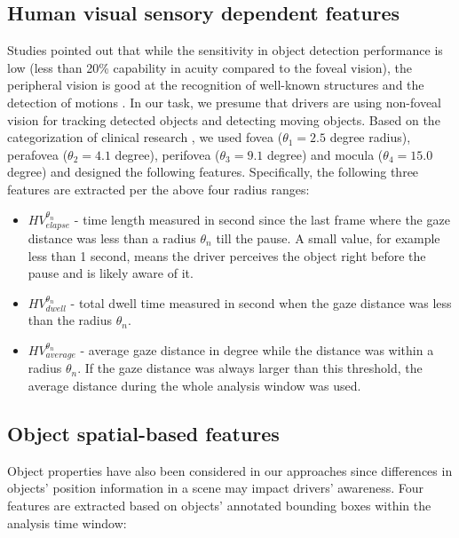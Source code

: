 \documentclass[letterpaper, 10 pt, conference]{ieeeconf}  %
\begin{document}
\subsection{Human visual sensory dependent features}\label{sec:fovea-feature}

Studies pointed out that while the sensitivity in object detection performance is low (less than 20\% capability in acuity compared to the foveal vision), the peripheral vision is good at the recognition of well-known structures and the detection of motions \cite{nelson1974motion}. In our task, we presume that drivers are using non-foveal vision for tracking detected objects and detecting moving objects. Based on the categorization of clinical research \cite{quinn2019clinical}, we used fovea ($\theta_1 = 2.5$ degree radius), perafovea ($\theta_2 = 4.1$ degree), perifovea ($\theta_3 = 9.1$ degree) and mocula ($\theta_4 = 15.0$ degree) and designed the following features. Specifically, the following three features are extracted per the above four radius ranges:

\begin{itemize}
    \item $HV^{\theta_n}_{elapse}$ - time length measured in second since the last frame where the gaze distance was less than a radius $\theta_n$ till the pause. A small value, for example less than 1 second, means the driver perceives the object right before the pause and is likely aware of it.
    \item $HV^{\theta_n}_{dwell}$ - total dwell time measured in second when the gaze distance was less than the radius $\theta_n$.
    \item $HV^{\theta_n}_{average}$ - average gaze distance in degree while the distance was within a radius $\theta_n$. If the gaze distance was always larger than this threshold, the average distance during the whole analysis window was used.
\end{itemize}

\subsection{Object spatial-based features}

Object properties have also been considered in our approaches since differences in objects' position information in a scene may impact drivers' awareness. Four features are extracted based on objects' annotated bounding boxes within the analysis time window:
\end{document}

